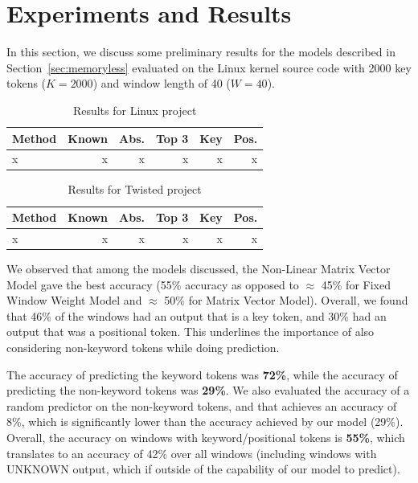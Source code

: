 \section{Experiments and Results}
\label{sec:results}
In this section, we discuss some preliminary results for the models described in
Section~\ref{sec:memoryless} evaluated on the Linux kernel source code with
2000 key tokens ($K = 2000$) and window length of 40 ($W = 40$).

\begin{table}[h]
  \centering
  \begin{tabular}{l r r r r r}
    \hline
    Method & Known & Abs. & Top 3 & Key & Pos. \\
    \hline
    x & x & x & x & x & x\\
    \hline
  \end{tabular}
  \caption{Results for Linux project}
  \label{tab:linux}
\end{table}

\begin{table}[h]
  \centering
  \begin{tabular}{l r r r r r}
    \hline
    Method & Known & Abs. & Top 3 & Key & Pos. \\
    \hline
    x & x & x & x & x & x\\
    \hline
  \end{tabular}
  \caption{Results for Twisted project}
  \label{tab:twisted}
\end{table}

We observed that among the models discussed, the Non-Linear Matrix Vector Model
gave the best accuracy (55\% accuracy as opposed to $\approx$ 45\% for Fixed
Window Weight Model and $\approx$ 50\% for Matrix Vector Model). Overall, we
found that 46\% of the windows had an output that is a key token, and 30\% had
an output that was a positional token. This underlines the importance of also
considering non-keyword tokens while doing prediction.

The accuracy of predicting the keyword tokens was {\bf 72\%}, while the accuracy
of predicting the non-keyword tokens was {\bf 29\%}. We also evaluated the
accuracy of a random predictor on the non-keyword tokens, and that achieves an
accuracy of 8\%, which is significantly lower than the accuracy achieved by our
model (29\%). Overall, the accuracy on windows with keyword/positional tokens is
{\bf 55\%}, which translates to an accuracy of 42\% over all windows (including
windows with UNKNOWN output, which if outside of the capability of our model to
predict).

